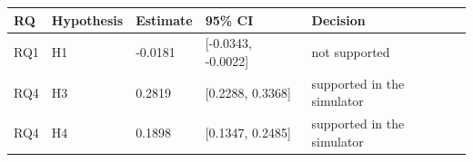 \begin{tabular}{lllll}
\toprule
RQ & Hypothesis & Estimate & 95\% CI & Decision \\
\midrule
RQ1 & H1 & -0.0181 & [-0.0343, -0.0022] & not supported \\
RQ4 & H3 & 0.2819 & [0.2288, 0.3368] & supported in the simulator \\
RQ4 & H4 & 0.1898 & [0.1347, 0.2485] & supported in the simulator \\
\bottomrule
\end{tabular}

